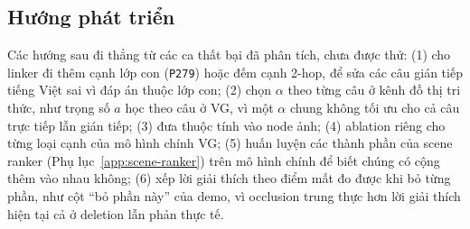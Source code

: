 \subsection{Hướng phát triển}
Các hướng sau đi thẳng từ các ca thất bại đã phân tích, chưa được thử: (1) cho linker đi thêm cạnh lớp con (\texttt{P279}) hoặc
đếm cạnh 2-hop, để sửa các câu gián tiếp tiếng Việt sai vì đáp án thuộc lớp con; (2) chọn $\alpha$ theo từng câu ở kênh đồ thị
tri thức, như trọng số $a$ học theo câu ở VG, vì một $\alpha$ chung không tối ưu cho cả câu trực tiếp lẫn gián tiếp; (3) đưa
thuộc tính vào node ảnh; (4) ablation riêng cho từng loại cạnh của mô hình chính VG; (5) huấn luyện các thành phần của scene
ranker (Phụ lục~\ref{app:scene-ranker}) trên mô hình chính để biết chúng có cộng thêm vào nhau không; (6) xếp lời giải thích
theo điểm mất đo được khi bỏ từng phần, như cột ``bỏ phần này'' của demo, vì occlusion trung thực hơn lời giải thích hiện
tại cả ở deletion lẫn phản thực tế.
